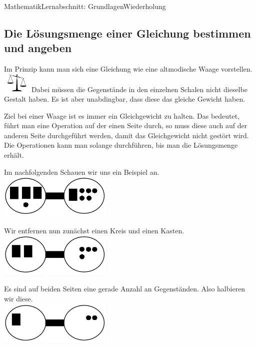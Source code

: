 \documentclass[11pt,twocolumn,oneside,openany,headings=optiontotoc,11pt,numbers=noenddot]{article}
\begin{document}
\begin{worksheet}{Mathematik}{Lernabschnitt: Grundlagen}{Wiederholung}
		\subsection{Die Lösungsmenge einer Gleichung bestimmen und angeben}
		Im Prinzip kann man sich eine Gleichung wie eine altmodische Waage vorstellen.\\
		\includegraphics[width=0.1\textwidth]{../99_Bilder/waage.jpg} Dabei müssen die Gegenstände in den einzelnen Schalen nicht dieselbe Gestalt haben. Es ist aber unabdingbar, dass diese das gleiche Gewicht haben.\\
		\par\bigskip\noindent
		Ziel bei einer Waage ist es immer ein Gleichgewicht zu halten. Das bedeutet, führt man eine Operation auf der einen Seite durch, so muss diese auch auf der anderen Seite durchgeführt werden, damit das Gleichgewicht nicht gestört wird.\\
		Die Operationen kann man solange durchführen, bis man die Lösungsmenge erhält.\\
		\begin{framed}
			\noindent
			Im nachfolgenden Schauen wir uns ein Beispiel an.\\
			\centering
			\includegraphics[width=0.4\textwidth]{../99_Bilder/L.jpg}\\
			\raggedright
			Wir entfernen nun zunächst einen Kreis und einen Kasten.\\
			\centering
			\includegraphics[width=0.4\textwidth]{../99_Bilder/L1.jpg}\\
			\raggedright
			Es sind auf beiden Seiten eine gerade Anzahl an \glqq{}Gegenständen\grqq{}. Also halbieren wir diese.\\
			\centering
			\includegraphics[width=0.4\textwidth]{../99_Bilder/L2.jpg}\\

\end{framed}
\end{worksheet}
\end{document}
